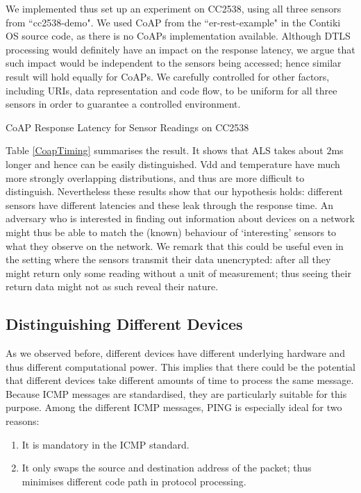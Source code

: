 \documentclass{article}
\begin{document}
We implemented thus set up an experiment on CC2538, using all three sensors from ``cc2538-demo". We used CoAP from the ``er-rest-example" in the Contiki OS source code, as there is no CoAPs implementation available. Although DTLS processing would definitely have an impact on the response latency, we argue that such impact would be independent to the sensors being accessed; hence similar result will hold equally for CoAPs. We carefully controlled for other factors, including URIs, data representation and code flow, to be uniform for all three sensors in order to guarantee a controlled environment.

\begin{table}
	\center
	
	\caption{CoAP Response Latency for Sensor Readings on CC2538\label{CoapTiming}}
\end{table}

Table \ref{CoapTiming} summarises the result. It shows that ALS takes about $2$ms longer and hence can be easily distinguished. Vdd and temperature have much more strongly overlapping distributions, and thus are more difficult to distinguish. Nevertheless these results show that our hypothesis holds: different sensors have different latencies and these leak through the response time. An adversary who is interested in finding out information about devices on a network might thus be able to match the (known) behaviour of `interesting' sensors to what they observe on the network. We remark that this could be useful even in the setting where the sensors transmit their data unencrypted: after all they might return only some reading without a unit of measurement; thus seeing their return data might not as such reveal their nature. 


\subsection{Distinguishing Different Devices}

As we observed before, different devices have different underlying hardware and thus different computational power. This implies that there could be the potential that different devices take different amounts of time to process the same message. Because ICMP messages are standardised, they are particularly suitable for this purpose. Among the different ICMP messages, PING is especially ideal for two reasons: 
\begin{enumerate}
	\item It is mandatory in the ICMP standard.
	\item It only swaps the source and destination address of the packet; thus minimises different code path in protocol processing.
\end{enumerate}
\end{document}
